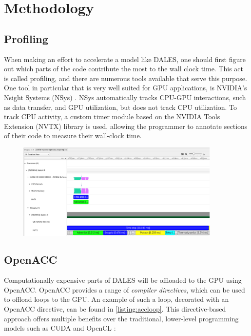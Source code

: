 \section{Methodology}

\subsection{Profiling}
When making an effort to accelerate a model like DALES, one should first figure out which parts of the code contribute the most to the wall clock time. This act is called profiling, and there are numerous tools available that serve this purpose. One tool in particular that is very well suited for GPU applications, is NVIDIA's Nsight Systems (NSys) \citep{nvidiaNVIDIANsightSystems}. NSys automatically tracks CPU-GPU interactions, such as data transfer, and GPU utilization, but does not track CPU utilization. To track CPU activity, a custom timer module based on the NVIDIA Tools Extension (NVTX) library is used, allowing the programmer to annotate sections of their code to measure their wall-clock time. 

\begin{figure}[H]
    \centering
    \includegraphics[width=0.9\textwidth]{doc/images/profiles/nsys.png}
    \caption{}
    \label{fig:my_label}
\end{figure}

\subsection{OpenACC}
Computationally expensive parts of DALES will be offloaded to the GPU using OpenACC. OpenACC provides a range of \emph{compiler directives}, which can be used to offload loops to the GPU. An example of such a loop, decorated with an OpenACC directive, can be found in \autoref{listing:accloop}. This directive-based approach offers multiple benefits over the traditional, lower-level programming models such as CUDA and OpenCL \citep{herdmanAcceleratingHydrocodesOpenACC2012}:


